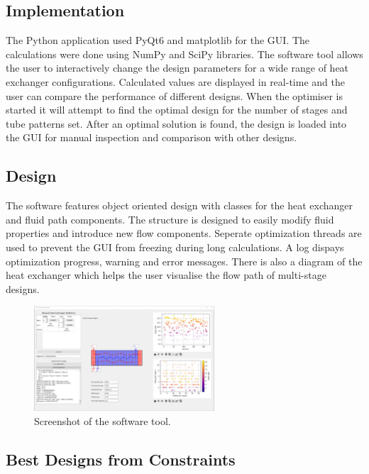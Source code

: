 \documentclass{article}
\begin{document}
\subsection{Implementation}

The Python application used PyQt6 and matplotlib for the GUI. The calculations were done using NumPy and SciPy libraries.
The software tool allows the user to interactively change the design parameters for a wide range of heat exchanger configurations.
Calculated values are displayed in real-time and the user can compare the performance of different designs.
When the optimiser is started it will attempt to find the optimal design for the number of stages and tube patterns set.
After an optimal solution is found, the design is loaded into the GUI for manual inspection and comparison with other designs.

\subsection{Design}
The software features object oriented design with classes for the heat exchanger and fluid path components.
The structure is designed to easily modify fluid properties and introduce new flow components.
Seperate optimization threads are used to prevent the GUI from freezing during long calculations.
A log dispays optimization progress, warning and error messages. There is also a diagram of the heat exchanger which helps
the user visualise the flow path of multi-stage designs.

\begin{figure}[H]
  \centering
  \includegraphics[width=0.6\textwidth]{software.png}
  \caption{Screenshot of the software tool.}
  \label{fig:software}
\end{figure}

\subsection{Best Designs from Constraints}
\end{document}
